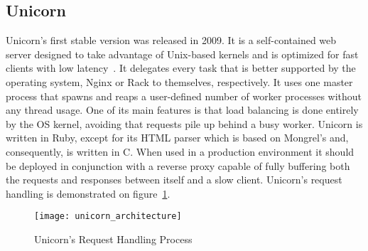 \subsection{Unicorn}
Unicorn's first stable version was released in 2009. It is a self-contained web server designed to take advantage of Unix-based kernels and is optimized for fast clients with low latency~\cite{unicorn}. It delegates every task that is better supported by the operating system, Nginx or Rack to themselves, respectively. It uses one master process that spawns and reaps a user-defined number of worker processes without any thread usage. One of its main features is that load balancing is done entirely by the OS kernel, avoiding that requests pile up behind a busy worker. Unicorn is written in Ruby, except for its HTML parser which is based on Mongrel's and, consequently, is written in C. When used in a production environment it should be deployed in conjunction with a reverse proxy capable of fully buffering both the requests and responses between itself and a slow client.
Unicorn's request handling is demonstrated on figure~\ref{fig:unicorn_architecture}.
\begin{figure}[h!t]
  \centering
  \caption{Unicorn's Request Handling Process}
  \label{fig:unicorn_architecture}
    \texttt{[image: unicorn\_architecture]}
\end{figure}
